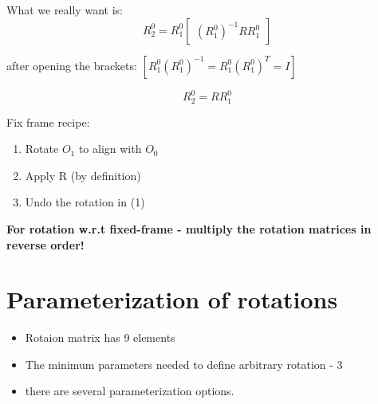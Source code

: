 \documentclass{article}
\begin{document}
What we really want is:\\
$$R^{0}_2 = R^{0}_1\begin{bmatrix}
(R^{0}_1)^{-1}RR^{0}_{1}
\end{bmatrix}  $$

after opening the brackets:
$\left[ R^{0}_1(R^{0}_1)^{-1} = R^{0}_1(R^{0}_1)^{T} = I \right] $

$$R^{0}_2 = RR^{0}_{1}  $$

Fix frame recipe:
\begin{enumerate}
    \item Rotate $O_1$ to align with $O_0$
    \item Apply R (by definition)
    \item Undo the rotation in (1)
\end{enumerate}

\textbf{For rotation w.r.t fixed-frame - multiply the rotation matrices in reverse order!}

\section{Parameterization of rotations}
\begin{itemize}
    \item Rotaion matrix has 9 elements
    \item The minimum parameters needed to define arbitrary rotation - 3
    \item there are several parameterization options.
\end{itemize}
\end{document}
